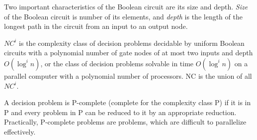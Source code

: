 Two important characteristics of the Boolean circuit are its size and depth. \textit{Size} of the Boolean circuit is number of its elements, and \textit{depth} is the length of the longest path in the circuit from an input to an output node.


$NC^i$ is the complexity class of decision problems decidable by uniform Boolean circuits with a polynomial number of gate nodes of at most two inputs and depth $O(\log^i n)$, or the class of decision problems solvable in time $O(\log^i n)$ on a parallel computer with a polynomial number of processors. NC is the union of all $NC^i$.


A decision problem is P-complete (complete for the complexity class P) if it is in P and every problem in P can be reduced to it by an appropriate reduction. Practically,  P-complete problems are problems, which are difficult to parallelize effectively.